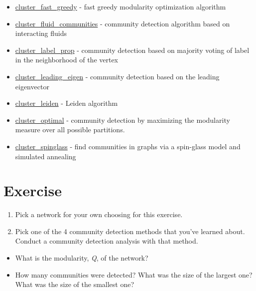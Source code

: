 \documentclass[
]{book}
\providecommand{\tightlist}{%
  \setlength{\itemsep}{0pt}\setlength{\parskip}{0pt}}
\begin{document}
\begin{itemize}
\tightlist
\item
  \href{https://igraph.org/r/doc/cluster_fast_greedy.html}{cluster\_fast\_greedy} - fast greedy modularity optimization algorithm
\item
  \href{https://igraph.org/r/doc/cluster_fluid_communities.html}{cluster\_fluid\_communities} - community detection algorithm based on interacting fluids
\item
  \href{https://igraph.org/r/doc/cluster_label_prop.html}{cluster\_label\_prop} - community detection based on majority voting of label in the neighborhood of the vertex
\item
  \href{https://igraph.org/r/doc/cluster_leading_eigen.html}{cluster\_leading\_eigen} - community detection based on the leading eigenvector
\item
  \href{https://igraph.org/r/doc/cluster_leiden.html}{cluster\_leiden} - Leiden algorithm
\item
  \href{https://igraph.org/r/doc/cluster_optimal.html}{cluster\_optimal} - community detection by maximizing the modularity measure over all possible partitions.
\item
  \href{https://igraph.org/r/doc/cluster_spinglass.html}{cluster\_spinglass} - find communities in graphs via a spin-glass model and simulated annealing
\end{itemize}

\section{Exercise}\label{exercise-6}

\begin{enumerate}
\def\labelenumi{\arabic{enumi}.}
\item
  Pick a network for your own choosing for this exercise.
\item
  Pick one of the 4 community detection methods that you've learned about. Conduct a community detection analysis with that method.
\end{enumerate}

\begin{itemize}
\tightlist
\item
  What is the modularity, \emph{Q}, of the network?
\item
  How many communities were detected? What was the size of the largest one? What was the size of the smallest one?
\end{itemize}
\end{document}
